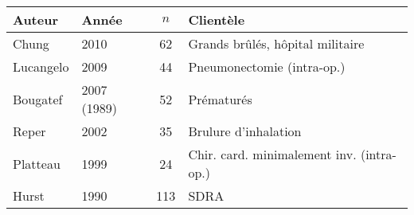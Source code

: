 \begin{table}
	\begin{tabular}{l l c p{6cm}}

\hline
Auteur	&	Année	&	$n$	& Clientèle\\
\hline
	Chung	&	2010	&	62	&	Grands brûlés, hôpital militaire\\
	Lucangelo	&	2009	&	44	&	Pneumonectomie (intra-op.)\\
	Bougatef	&	2007	(1989)	&	52	&	Prématurés\\
	Reper	&	2002	&	35	&	Brulure d'inhalation\\
	Platteau	&	1999	&	24	&	Chir. card. minimalement inv. (intra-op.)\\
		Hurst	&	1990	&	113	&	SDRA\\
\hline

\end{tabular}
\end{table}
